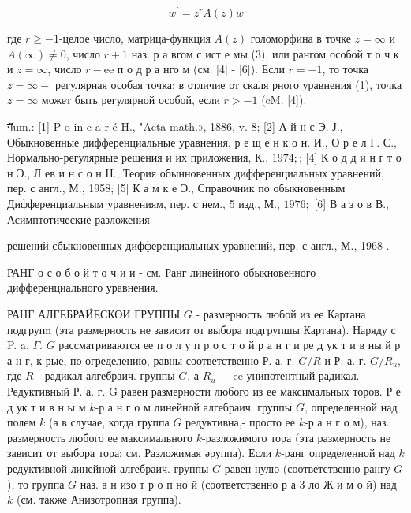 \documentclass[10pt]{article}
\begin{document}
\[

w^{\prime}=z^{r} A(z) w

\]



где $r \geqslant-1$-целое число, матрица-функция $A(z)$ голоморфина в точке $z=\infty$ и $A(\infty) \neq 0$, число $r+1$ наз. р а вгом с ист е мы (3), или рангом особой т о ч к и $z=\infty$, число $r-\mathrm{ee}$ п о д р а нго м (см. [4] - [6]). Если $r=-1$, то точка $z=\infty-$ регулярная особая точка; в отличие от скаля рного уравнения (1), точка $z=\infty$ может быть регулярной особой, если $r>-1$ (cM. [4]).



ग̈um.: [1] P o in c a r é H., "Acta math.», 1886, v. 8; [2] А й н с Э. Ј., Обыкновенные дифференциальные уравнения, р е щ е н к о н. И., О р е л Г. С., Нормально-регулярные решения и их приложения, К., $1974 ;$; [4] К о д д и н г т о н Э., Л ев и н с о н Н., Теория обынновенных дифференциальных уравнений, пер. с англ., М., 1958; [5] К а м к е Э., Справочник по обыкновенным Дифференциальным уравнениям, пер. с нем., 5 изд., М., $1976 ;$ [6] В а з о в В., Асимптотические разложения

решений сбыкновенных дифференциальных уравнений, пер. с англ., М., 1968 .



РАНГ о с о б о й т о ч и и - см. Ранг линейного обыкновенного дифференциального уравнения.



РАНГ АЛГЕБРАЙЕСКОИ ГРУППЫ $G$ - размерность любой из ее Картана подгрупn (эта размерность не зависит от выбора подгрупшы Картана). Наряду с P. a. $\Gamma$. $G$ рассматриваются ее п о л у п р о с т о й р а н г и ре д ук т и в ны й р а н г, к-рые, по огределению, равны соответственно Р. а. г. $G / R$ и Р. а. г. $G / R_{u}$, где $R$ - радикал алгебраич. группы $G$, а $R_{u}-$ ee унипотентный радикал. Редуктивный Р. а. г. G равен размерности любого из ее максимальных торов. Р е д ук т и в н ы м $k$-р а н г о м линейной алгебраич. группы $G$, определенной над полем $k$ (а в случае, когда группа $G$ редуктивна,- просто ее $k$-р а н г о м), наз. размерность любого ее максимального $k$-разложимого тора (эта размерность не зависит от выбора тора; см. Разложимая әруппа). Если $k$-ранг определенной над $k$ редуктивной линейной алгебраич. группы $G$ равен нулю (соответственно рангу $G$ ), то группа $G$ наз. а н изо т р о п но й (соответственно р а 3 ло Ж и м о й) над $k$ (см. также Анизотропная группа).
\end{document}

